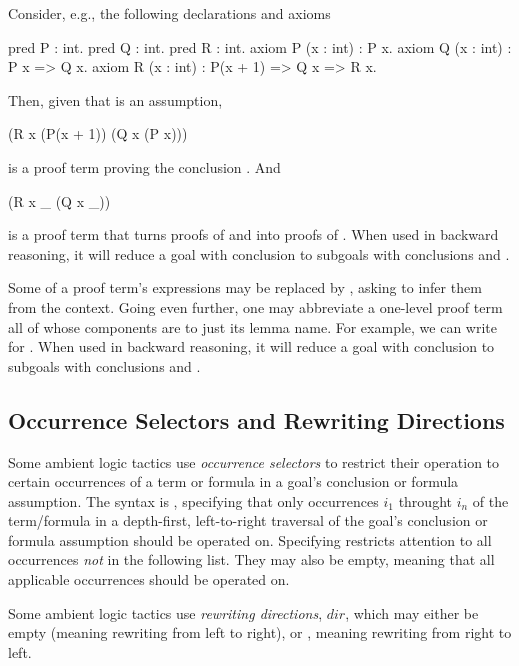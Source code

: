 Consider, e.g., the following declarations and axioms
\begin{easycrypt}{}{}
pred P : int.
pred Q : int.
pred R : int.
axiom P (x : int) : P x.
axiom Q (x : int) : P x => Q x.
axiom R (x : int) : P(x + 1) => Q x => R x.
\end{easycrypt}
Then, given that  is an assumption,
\begin{easycrypt}{}{}
(R x (P(x + 1)) (Q x (P x)))
\end{easycrypt}
is a proof term proving the conclusion . And
\begin{easycrypt}{}{}
(R x _ (Q x _))
\end{easycrypt}
is a proof term that turns proofs of  and 
into proofs of . When used in backward reasoning, it
will reduce a goal with conclusion  to subgoals with
conclusions  and .

Some of a proof term's expressions may be replaced by \ec{_}, asking
\EasyCrypt to infer them from the context.  Going even further, one
may abbreviate a one-level proof term all of whose components are
\ec{_} to just its lemma name. For example, we can write  for
.  When used in backward reasoning, it will reduce a
goal with conclusion  to subgoals with conclusions  and . 

\subsection{Occurrence Selectors and Rewriting Directions}
\label{subsec:occsels}

Some ambient logic tactics use \emph{occurrence selectors} to restrict
their operation to certain occurrences of a term or formula in a
goal's conclusion or formula assumption. The syntax is , specifying that only occurrences $i_1$
throught $i_n$ of the term/formula in a depth-first, left-to-right
traversal of the goal's conclusion or formula assumption should be
operated on. Specifying 
restricts attention to all occurrences \emph{not} in the following
list. They may also be empty, meaning that all applicable occurrences
should be operated on.

Some ambient logic tactics use \emph{rewriting directions}, $\mathit{dir}$,
which may either be empty (meaning rewriting from left to right), or \ec{-},
meaning rewriting from right to left.

